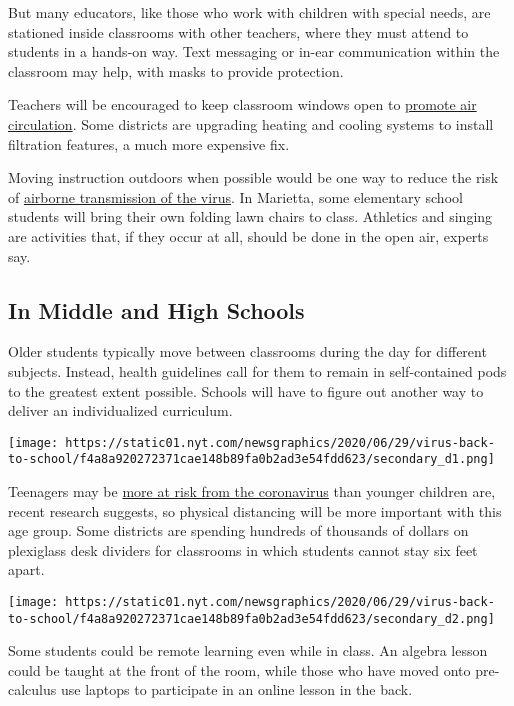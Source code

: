 But many educators, like those who work with children with special
needs, are stationed inside classrooms with other teachers, where they
must attend to students in a hands-on way. Text messaging or in-ear
communication within the classroom may help, with masks to provide
protection.

Teachers will be encouraged to keep classroom windows open to
\href{https://www.nytimes.com/2020/07/06/health/coronavirus-airborne-aerosols.html}{promote
air circulation}. Some districts are upgrading heating and cooling
systems to install filtration features, a much more expensive fix.

Moving instruction outdoors when possible would be one way to reduce the
risk of
\href{https://www.nytimes.com/2020/07/06/health/coronavirus-airborne-aerosols.html}{airborne
transmission of the virus}. In Marietta, some elementary school students
will bring their own folding lawn chairs to class. Athletics and singing
are activities that, if they occur at all, should be done in the open
air, experts say.

\hypertarget{in-middle-and-high-schools}{%
\subsection{In Middle and High
Schools}\label{in-middle-and-high-schools}}

Older students typically move between classrooms during the day for
different subjects. Instead, health guidelines call for them to remain
in self-contained pods to the greatest extent possible. Schools will
have to figure out another way to deliver an individualized curriculum.

\texttt{[image: https://static01.nyt.com/newsgraphics/2020/06/29/virus-back-to-school/f4a8a920272371cae148b89fa0b2ad3e54fdd623/secondary\_d1.png]}

Teenagers may be
\href{https://www.nytimes.com/2020/07/18/health/coronavirus-children-schools.html}{more
at risk from the coronavirus} than younger children are, recent research
suggests, so physical distancing will be more important with this age
group. Some districts are spending hundreds of thousands of dollars on
plexiglass desk dividers for classrooms in which students cannot stay
six feet apart.

\texttt{[image: https://static01.nyt.com/newsgraphics/2020/06/29/virus-back-to-school/f4a8a920272371cae148b89fa0b2ad3e54fdd623/secondary\_d2.png]}

Some students could be remote learning even while in class. An algebra
lesson could be taught at the front of the room, while those who have
moved onto pre-calculus use laptops to participate in an online lesson
in the back.

